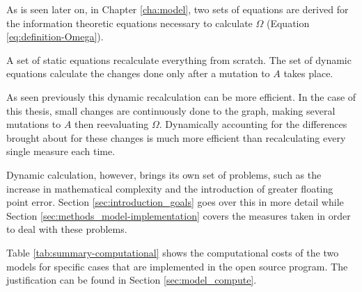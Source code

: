 As is seen later on, in Chapter \ref{cha:model}, two sets of equations are derived for the information theoretic equations necessary to calculate $\Omega$ (Equation \eqref{eq:definition-Omega}).

A set of static equations recalculate everything from scratch.
The set of dynamic equations calculate the changes done only after a mutation to $A$ takes place.

As seen previously this dynamic recalculation can be more efficient.
In the case of this thesis, small changes are continuously done to the graph, making several mutations to $A$ then reevaluating $\Omega$.
Dynamically accounting for the differences brought about for these changes is much more efficient than recalculating every single measure each time.

Dynamic calculation, however, brings its own set of problems, such as the increase in mathematical complexity and the introduction of greater floating point error.
Section \ref{sec:introduction_goals} goes over this in more detail while Section \ref{sec:methods_model-implementation} covers the measures taken in order to deal with these problems.

Table \ref{tab:summary-computational} shows the computational costs of the two models for specific cases that are implemented in the \CC{} open source program.
The justification can be found in Section \ref{sec:model_compute}.


